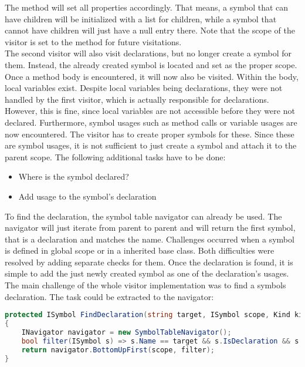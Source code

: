 The  method will set all properties accordingly.
That means, a symbol that can have children will be initialized with a list for children, while a symbol that cannot have children will just have a null entry there.
Note that the scope of the visitor is set to the method for future visitations.\\

The second visitor will also visit declarations, but no longer create a symbol for them.
Instead, the already created symbol is located and set as the proper scope.
Once a method body is encountered, it will now also be visited.
Within the body, local variables exist.
Despite local variables being declarations, they were not handled by the first visitor, which is actually responsible for declarations.
However, this is fine, since local variables are not accessible before they were not declared.
Furthermore, symbol usages such as method calls or variable usages are now encountered.
The visitor has to create proper symbols for these.
Since these are symbol usages, it is not sufficient to just create a symbol and attach it to the parent scope.
The following additional tasks have to be done:
\begin{itemize}
    \item Where is the symbol declared?
    \item Add usage to the symbol's declaration
\end{itemize}

To find the declaration, the symbol table navigator can already be used.
The navigator will just iterate from parent to parent and will return the first symbol, that is a declaration and matches the name.
Challenges occurred when a symbol is defined in global scope or in a inherited base class.
Both difficulties were resolved by adding separate checks for them.
Once the declaration is found, it is simple to add the just newly created symbol as one of the declaration's usages.\\

The main challenge of the whole visitor implementation was to find a symbols declaration.
The task could be extracted to the navigator:

\begin{lstlisting}[language=csharp, caption={Finding a Declaration}, captionpos=b, label={lst:visitorfinddecl}]
protected ISymbol FindDeclaration(string target, ISymbol scope, Kind kind)
{
    INavigator navigator = new SymbolTableNavigator();
    bool filter(ISymbol s) => s.Name == target && s.IsDeclaration && s.Kind == kind;
    return navigator.BottomUpFirst(scope, filter);
}
\end{lstlisting}

